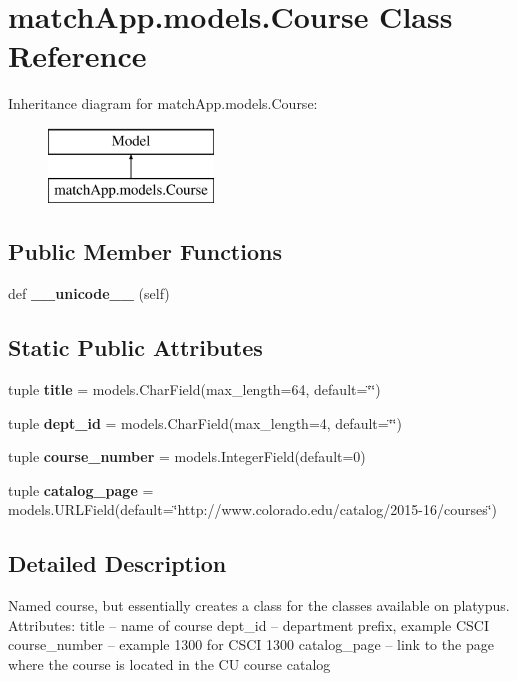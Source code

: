 \section{match\+App.\+models.\+Course Class Reference}
\label{classmatch_app_1_1models_1_1_course}
Inheritance diagram for match\+App.\+models.\+Course\+:\begin{figure}[H]
\begin{center}
\leavevmode
\includegraphics[height=2.000000cm]{classmatch_app_1_1models_1_1_course}
\end{center}
\end{figure}
\subsection*{Public Member Functions}
\begin{DoxyCompactItemize}
\item 
def {\bf \+\_\+\+\_\+unicode\+\_\+\+\_\+} (self)
\end{DoxyCompactItemize}
\subsection*{Static Public Attributes}
\begin{DoxyCompactItemize}
\item 
tuple {\bf title} = models.\+Char\+Field(max\+\_\+length=64, default=\char`\"{}\char`\"{})
\item 
tuple {\bf dept\+\_\+id} = models.\+Char\+Field(max\+\_\+length=4, default=\char`\"{}\char`\"{})
\item 
tuple {\bf course\+\_\+number} = models.\+Integer\+Field(default=0)
\item 
tuple {\bf catalog\+\_\+page} = models.\+U\+R\+L\+Field(default=\char`\"{}http\+://www.\+colorado.\+edu/catalog/2015-\/16/courses\char`\"{})
\end{DoxyCompactItemize}


\subsection{Detailed Description}
\begin{DoxyVerb}Named course, but essentially creates a class for the classes available on platypus.
Attributes: 
title -- name of course 
dept_id -- department prefix, example CSCI 
course_number -- example 1300 for CSCI 1300 
catalog_page --  link to the page where the course is located in the CU course catalog
\end{DoxyVerb}
 


